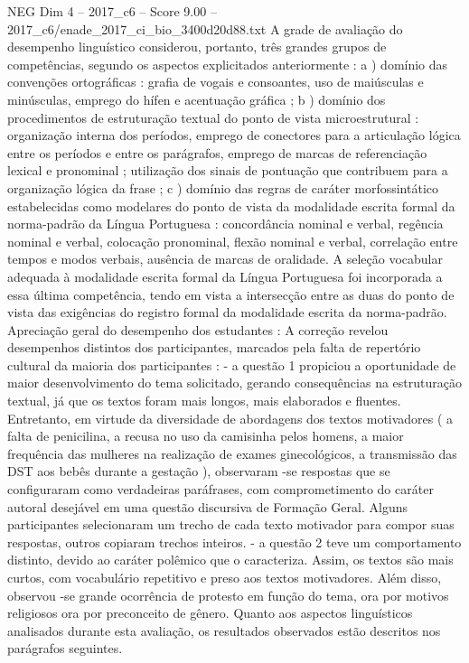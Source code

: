 \begin{textsample}{NEG Dim 4 – 2017\_c6 – Score 9.00 – 2017\_c6/enade\_2017\_ci\_bio\_3400d20d88.txt}
A grade de avaliação do desempenho linguístico considerou, portanto, três grandes grupos de competências, segundo os aspectos explicitados anteriormente : a ) domínio das convenções ortográficas : grafia de vogais e consoantes, uso de maiúsculas e minúsculas, emprego do hífen e acentuação gráfica ; b ) domínio dos procedimentos de estruturação textual do ponto de vista microestrutural : organização interna dos períodos, emprego de conectores para a articulação lógica entre os períodos e entre os parágrafos, emprego de marcas de referenciação lexical e pronominal ; utilização dos sinais de pontuação que contribuem para a organização lógica da frase ; c ) domínio das regras de caráter morfossintático estabelecidas como modelares do ponto de vista da modalidade escrita formal da norma-padrão da Língua Portuguesa : concordância nominal e verbal, regência nominal e verbal, colocação pronominal, flexão nominal e verbal, correlação entre tempos e modos verbais, ausência de marcas de oralidade.
A seleção vocabular adequada à modalidade escrita formal da Língua Portuguesa foi incorporada a essa última competência, tendo em vista a intersecção entre as duas do ponto de vista das exigências do registro formal da modalidade escrita da norma-padrão.
Apreciação geral do desempenho dos estudantes : A correção revelou desempenhos distintos dos participantes, marcados pela falta de repertório cultural da maioria dos participantes : - a questão 1 propiciou a oportunidade de maior desenvolvimento do tema solicitado, gerando consequências na estruturação textual, já que os textos foram mais longos, mais elaborados e fluentes.
Entretanto, em virtude da diversidade de abordagens dos textos motivadores ( a falta de penicilina, a recusa no uso da camisinha pelos homens, a maior frequência das mulheres na realização de exames ginecológicos, a transmissão das DST aos bebês durante a gestação ), observaram -se respostas que se configuraram como verdadeiras paráfrases, com comprometimento do caráter autoral desejável em uma questão discursiva de Formação Geral.
Alguns participantes selecionaram um trecho de cada texto motivador para compor suas respostas, outros copiaram trechos inteiros. - a questão 2 teve um comportamento distinto, devido ao caráter polêmico que o caracteriza.
Assim, os textos são mais curtos, com vocabulário repetitivo e preso aos textos motivadores.
Além disso, observou -se grande ocorrência de protesto em função do tema, ora por motivos religiosos ora por preconceito de gênero.
Quanto aos aspectos linguísticos analisados durante esta avaliação, os resultados observados estão descritos nos parágrafos seguintes.

\end{textsample}
